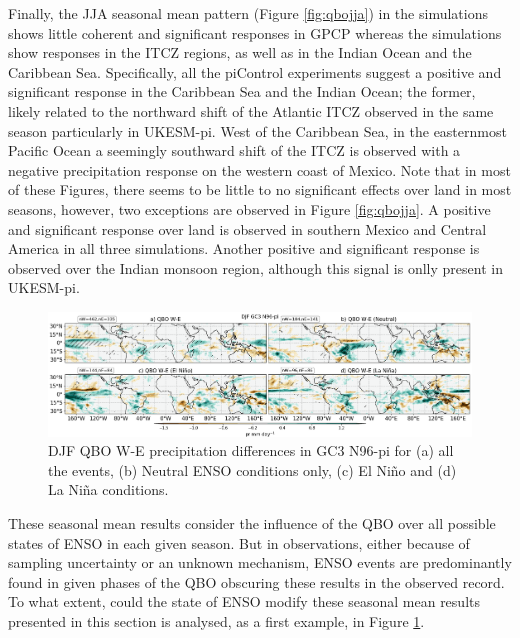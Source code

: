Finally, the JJA seasonal mean pattern (Figure \ref{fig:qbojja}) in the simulations shows little coherent and significant responses in GPCP whereas the simulations show responses in the ITCZ regions, as well as in the Indian Ocean and the Caribbean Sea. Specifically, all the piControl experiments suggest a positive and significant response in the Caribbean Sea and the Indian Ocean; the former, likely related to the northward shift of the Atlantic ITCZ observed in the same season particularly in UKESM-pi. West of the Caribbean Sea, in the easternmost Pacific Ocean a seemingly southward shift of the ITCZ is observed with a negative precipitation response on the western coast of Mexico. Note that in most of these Figures, there seems to be little to no significant effects over land in most seasons, however, two exceptions are observed in Figure \ref{fig:qbojja}. 
A positive and significant response over land is observed in southern Mexico and Central America in all three simulations. Another positive and significant response is observed over the Indian monsoon region, although this signal is onlly present in UKESM-pi. 


\begin{figure}[t!]
\centering
 \includegraphics[width=\linewidth]{figures/ensoqboprdjf.png}
\caption[Precipitation response to QBO W-E for GC3 N96-pi under different QBO phases.]{ DJF QBO W-E precipitation differences in GC3 N96-pi for (a) all the events, (b) Neutral ENSO conditions only, (c) El Niño and (d) La Niña conditions. }
\label{fig:qboenso}
\end{figure}

These seasonal mean results consider the influence of the QBO over all possible states of ENSO in each given season. But in observations, either because of sampling uncertainty or an unknown mechanism, ENSO events are predominantly found in given phases of the QBO obscuring these results in the observed record. To what extent, could the state of ENSO modify these seasonal mean results presented in this section is analysed, as a first example, in Figure \ref{fig:qboenso}. 


